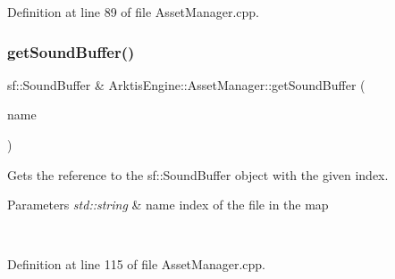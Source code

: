 Definition at line 89 of file Asset\+Manager.\+cpp.


\begin{DoxyCode}{0}

\end{DoxyCode}
\mbox{\label{class_arktis_engine_1_1_asset_manager_abf8ef54c6c562df3ec3fe93bb8643fe4}} 
\subsubsection{\texorpdfstring{getSoundBuffer()}{getSoundBuffer()}}
{\footnotesize\ttfamily sf\+::\+Sound\+Buffer \& Arktis\+Engine\+::\+Asset\+Manager\+::get\+Sound\+Buffer (\begin{DoxyParamCaption}\item[{std\+::string}]{name }\end{DoxyParamCaption})}



Gets the reference to the sf\+::\+Sound\+Buffer object with the given index. 


\begin{DoxyParams}{Parameters}
{\em std\+::string} & name index of the file in the map \begin{DoxyVerb}\end{DoxyVerb}
 \\
\hline
\end{DoxyParams}


Definition at line 115 of file Asset\+Manager.\+cpp.


\begin{DoxyCode}{0}

\end{DoxyCode}
\mbox{\label{class_arktis_engine_1_1_asset_manager_a3a44df92faeed35c9f9200f5b4446c0a}} 
